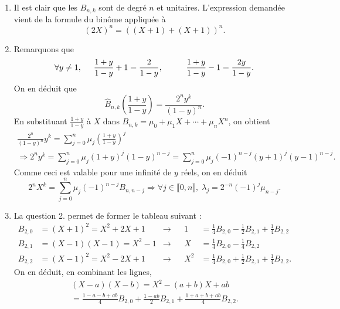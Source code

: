 \begin{enumerate}
\item  Il est clair que les $B_{n,k}$ sont de degré $n$ et unitaires. L'expression demand\'{e}e vient de la formule du bin\^{o}me appliqu\'{e}e \`{a} 
\[
(2X)^{n}=((X+1)+(X+1))^{n}. 
\]

\item  Remarquons que 
\[
 \forall y\neq 1, \hspace{0.5cm} \frac{1+y}{1-y}+1 = \frac{2}{1-y},\hspace{1cm} 
 \frac{1+y}{1-y}-1 = \frac{2y}{1-y}.
\]
On en d\'{e}duit que 
\[
\widehat{B}_{n,k}(\frac{1+y}{1-y})=\frac{2^{n}y^{k}}{(1-y)^{n}}.
\]
En substituant $\frac{1+y}{1-y}$ \`{a} $X$ dans $B_{n,k} = \mu_0 + \mu_1 X + \cdots + \mu_nX^n$, on obtient 
\begin{multline*}
\frac{2^{n}}{(1-y)^{n}}y^{k} = \sum_{j=0}^{n}\mu _{j}\left( \frac{1+y}{1-y}\right) ^{j} \\
\Rightarrow 2^{n}y^{k} 
= \sum_{j=0}^{n}\mu _{j}(1+y)^{j}(1-y)^{n-j}
= \sum_{j=0}^{n}\mu_{j}(-1)^{n-j}(y+1)^{j}(y-1)^{n-j}.
\end{multline*}
Comme ceci est valable pour une infinit\'{e} de $y$ réels, on en d\'{e}duit 
\[
2^{n}X^{k}=\sum_{j=0}^{n}\mu _{j}(-1)^{n-j}B_{n,n-j}
\Rightarrow \forall j \in \llbracket 0,n \rrbracket, \;\lambda _{j}=2^{-n}(-1)^{j}\mu _{n-j}.
\]

\item  La question 2. permet de former le tableau suivant : 
\begin{align*}
B_{2,0} &= (X+1)^{2} = X^{2}+2X+1 &\rightarrow&  &1     &= \frac{1}{4}B_{2,0} - \frac{1}{2}B_{2,1}+\frac{1}{4}B_{2,2} \\
B_{2,1} &= (X-1)(X-1) = X^{2} - 1 &\rightarrow&  &X     &= \frac{1}{4}B_{2,0} - \frac{1}{4}B_{2,2} \\
B_{2,2} &= (X-1)^{2} = X^{2}-2X+1 &\rightarrow&  &X^{2} &=\frac{1}{4}B_{2,0}+\frac{1}{2}B_{2,1}+\frac{1}{4}B_{2,2}.
\end{align*}
On en d\'{e}duit, en combinant les lignes, 
\begin{multline*}
(X-a)(X-b) = X^{2}-(a+b)X+ab \\
 = \frac{1-a-b+ab}{4}B_{2,0} + \frac{1-ab}{2}B_{2,1} + \frac{1+a+b+ab}{4}B_{2,2}.
\end{multline*}


\end{enumerate}
